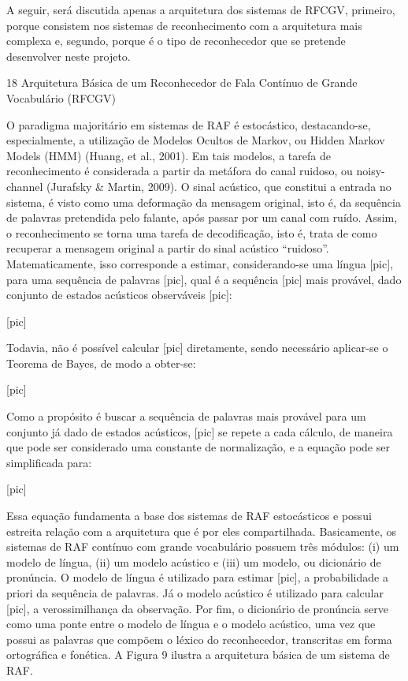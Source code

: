 A seguir, ser\'a discutida apenas a arquitetura dos sistemas de RFCGV,
primeiro, porque consistem nos sistemas de reconhecimento com a
arquitetura mais complexa e, segundo, porque \'e o tipo de reconhecedor
que se pretende desenvolver neste projeto.

18 Arquitetura B\'asica de um Reconhecedor de Fala Cont\'inuo de Grande
Vocabul\'ario (RFCGV)

O paradigma majorit\'ario em sistemas de RAF \'e estoc\'astico, destacando-se,
especialmente, a utiliza\c{c}\~ao de Modelos Ocultos de Markov, ou Hidden
Markov Models (HMM) (Huang, et al., 2001). Em tais modelos, a tarefa de
reconhecimento \'e considerada a partir da met\'afora do canal ruidoso, ou
noisy-channel (Jurafsky \& Martin, 2009). O sinal ac\'ustico, que
constitui a entrada no sistema, \'e visto como uma deforma\c{c}\~ao da mensagem
original, isto \'e, da sequ\^encia de palavras pretendida pelo falante, ap\'os
passar por um canal com ru\'ido. Assim, o reconhecimento se torna uma
tarefa de decodifica\c{c}\~ao, isto \'e, trata de como recuperar a mensagem
original a partir do sinal ac\'ustico ``ruidoso''. Matematicamente, isso
corresponde a estimar, considerando-se uma l\'ingua {[}pic{]}, para uma
sequ\^encia de palavras {[}pic{]}, qual \'e a sequ\^encia {[}pic{]} mais
prov\'avel, dado conjunto de estados ac\'usticos observ\'aveis {[}pic{]}:

{[}pic{]}

Todavia, n\~ao \'e poss\'ivel calcular {[}pic{]} diretamente, sendo necess\'ario
aplicar-se o Teorema de Bayes, de modo a obter-se:

{[}pic{]}

Como a prop\'osito \'e buscar a sequ\^encia de palavras mais prov\'avel para um
conjunto j\'a dado de estados ac\'usticos, {[}pic{]} se repete a cada
c\'alculo, de maneira que pode ser considerado uma constante de
normaliza\c{c}\~ao, e a equa\c{c}\~ao pode ser simplificada para:

{[}pic{]}

Essa equa\c{c}\~ao fundamenta a base dos sistemas de RAF estoc\'asticos e possui
estreita rela\c{c}\~ao com a arquitetura que \'e por eles compartilhada.
Basicamente, os sistemas de RAF cont\'inuo com grande vocabul\'ario possuem
tr\^es m\'odulos: (i) um modelo de l\'ingua, (ii) um modelo ac\'ustico e (iii)
um modelo, ou dicion\'ario de pron\'uncia. O modelo de l\'ingua \'e utilizado
para estimar {[}pic{]}, a probabilidade a priori da sequ\^encia de
palavras. J\'a o modelo ac\'ustico \'e utilizado para calcular {[}pic{]}, a
verossimilhan\c{c}a da observa\c{c}\~ao. Por fim, o dicion\'ario de pron\'uncia serve
como uma ponte entre o modelo de l\'ingua e o modelo ac\'ustico, uma vez que
possui as palavras que comp\~oem o l\'exico do reconhecedor, transcritas em
forma ortogr\'afica e fon\'etica. A Figura 9 ilustra a arquitetura b\'asica de
um sistema de RAF.

